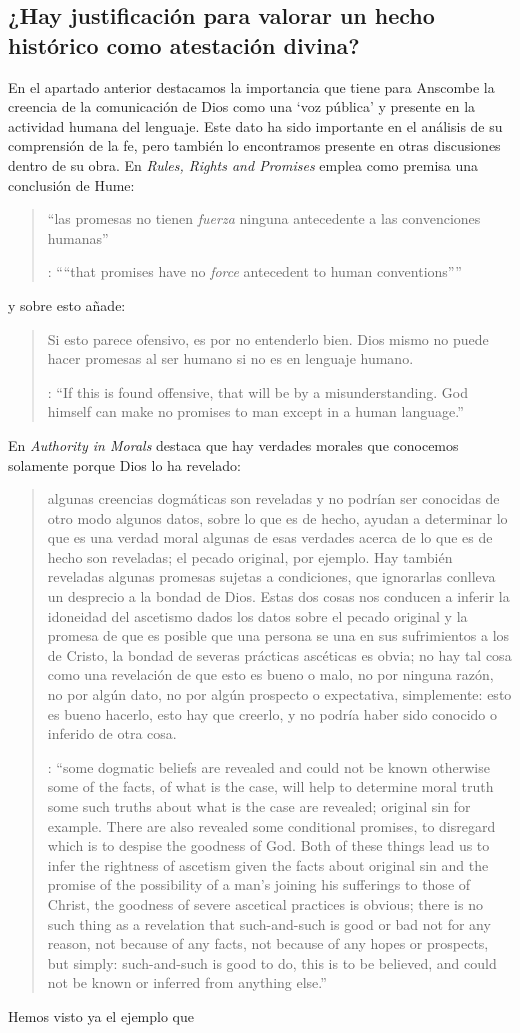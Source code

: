 \subsection{¿Hay justificación para valorar un hecho histórico como atestación divina?}

En el apartado anterior destacamos la importancia que tiene para Anscombe la creencia de la comunicación de Dios como una `voz pública' y presente en la actividad humana del lenguaje. Este dato ha sido importante en el análisis de su comprensión de la fe, pero también lo encontramos presente en otras discusiones dentro de su obra. En \emph{Rules, Rights and Promises} emplea como premisa una conclusión de Hume: \blockquote[{\cite[99]{anscombe1981erp:rrp}}: \enquote{``that promises have no \emph{force} antecedent to human conventions''}]{``las promesas no tienen \emph{fuerza} ninguna antecedente a las convenciones humanas''} y sobre esto añade: \blockquote[{\cite[99]{anscombe1981erp:rrp}}: \enquote{If this is found offensive, that will be by a misunderstanding. God himself can make no promises to man except in a human language.}]{Si esto parece ofensivo, es por no entenderlo bien. Dios mismo no puede hacer promesas al ser humano si no es en lenguaje humano.} En \emph{Authority in Morals} destaca que hay verdades morales que conocemos solamente porque Dios lo ha revelado: \blockquote[{\cite[48--49]{anscombe1981erp:am}}: \enquote{some dogmatic beliefs are revealed and could not be known otherwise \textelp{} some of the facts, of what is the case, will help to determine moral truth \textelp{} some such truths about what is the case are revealed; original sin for example. There are also revealed some conditional promises, to disregard which is to despise the goodness of God. Both of these things lead us to infer the rightness of ascetism \textelp{} given the facts about original sin and the promise of the possibility of a man's joining his sufferings to those of Christ, the goodness of severe ascetical practices \textelp{} is obvious; there is no such thing as a revelation that such-and-such is good or bad not for any reason, not because of any facts, not because of any hopes or prospects, but simply: such-and-such is good to do, this is to be believed, and could not be known or inferred from anything else.}]{algunas creencias dogmáticas son reveladas y no podrían ser conocidas de otro modo \textelp{} algunos datos, sobre lo que es de hecho, ayudan a determinar lo que es una verdad moral \textelp{} algunas de esas verdades acerca de lo que es de hecho son reveladas; el pecado original, por ejemplo. Hay también reveladas algunas promesas sujetas a condiciones, que ignorarlas conlleva un desprecio a la bondad de Dios. Estas dos cosas nos conducen a inferir la idoneidad del ascetismo \textelp{} dados los datos sobre el pecado original y la promesa de que es posible que una persona se una en sus sufrimientos a los de Cristo, la bondad de severas prácticas ascéticas \textelp{} es obvia; no hay tal cosa como una revelación de que esto es bueno o malo, no por ninguna razón, no por algún dato, no por algún prospecto o expectativa, simplemente: esto es bueno hacerlo, esto hay que creerlo, y no podría haber sido conocido o inferido de otra cosa.} Hemos visto ya el ejemplo que 